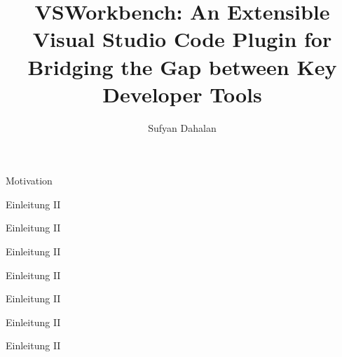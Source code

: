 \documentclass[12pt,rgb]{beamer}
\begin{document}
\title{VSWorkbench: An Extensible Visual Studio Code Plugin for Bridging the Gap between Key Developer Tools}

    \author[Sufyan Dahalan]{Sufyan Dahalan}
    \maketitle
    \begin{frame}[t]{Motivation}
        \parbox{\textwidth}{
                }
            \end{frame}
            
            \begin{frame}[t]{Einleitung \textrm{II}}
                \parbox{\textwidth}{
}
\end{frame}

\begin{frame}[t]{Einleitung \textrm{II}}
    \parbox{\textwidth}{
}
\end{frame}

\begin{frame}[t]{Einleitung \textrm{II}}
    \parbox{\textwidth}{
}
\end{frame}

\begin{frame}[t]{Einleitung \textrm{II}}
    \parbox{\textwidth}{
}
\end{frame}

\begin{frame}[t]{Einleitung \textrm{II}}
    \parbox{\textwidth}{
}
\end{frame}

\begin{frame}[t]{Einleitung \textrm{II}}
    \parbox{\textwidth}{
}
\end{frame}

\begin{frame}[t]{Einleitung \textrm{II}}
    \parbox{\textwidth}{
}
\end{frame}
\end{document}
